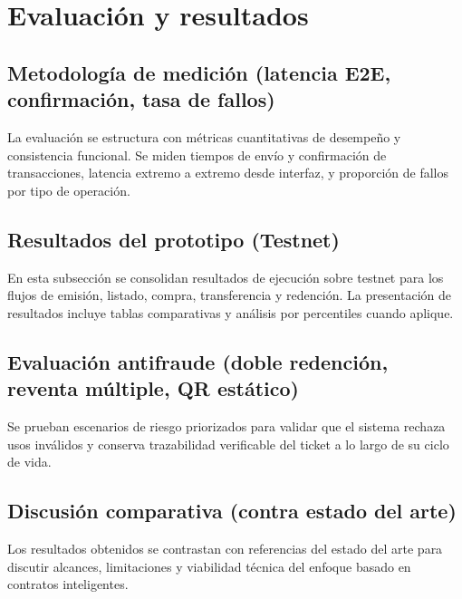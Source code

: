 
\section{Evaluación y resultados}

\subsection{Metodología de medición (latencia E2E, confirmación, tasa de fallos)}

La evaluación se estructura con métricas cuantitativas de desempeño y consistencia funcional. Se miden tiempos de envío y confirmación de transacciones, latencia extremo a extremo desde interfaz, y proporción de fallos por tipo de operación.

\subsection{Resultados del prototipo (Testnet)}

En esta subsección se consolidan resultados de ejecución sobre testnet para los flujos de emisión, listado, compra, transferencia y redención. La presentación de resultados incluye tablas comparativas y análisis por percentiles cuando aplique.

\subsection{Evaluación antifraude (doble redención, reventa múltiple, QR estático)}

Se prueban escenarios de riesgo priorizados para validar que el sistema rechaza usos inválidos y conserva trazabilidad verificable del ticket a lo largo de su ciclo de vida.

\subsection{Discusión comparativa (contra estado del arte)}

Los resultados obtenidos se contrastan con referencias del estado del arte para discutir alcances, limitaciones y viabilidad técnica del enfoque basado en contratos inteligentes.

